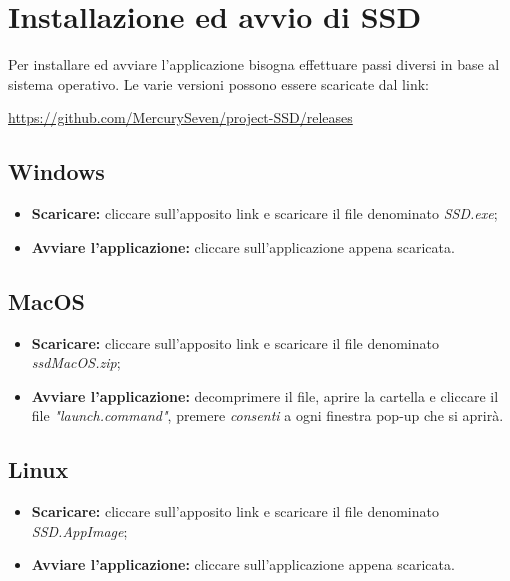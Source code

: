 \section{Installazione ed avvio di SSD}
Per installare ed avviare l'applicazione  bisogna effettuare passi diversi in base al sistema operativo. Le varie versioni possono essere scaricate dal link: \newline{}
\centerline{\url{https://github.com/MercurySeven/project-SSD/releases}}

\subsection{Windows}
\begin{itemize}
\item \textbf{Scaricare:} cliccare sull'apposito link e scaricare il file denominato \textit{SSD.exe};
\item \textbf{Avviare l'applicazione:} cliccare sull'applicazione appena scaricata.
\end{itemize}

\subsection{MacOS}
\begin{itemize}
\item \textbf{Scaricare:} cliccare sull'apposito link e scaricare il file denominato \textit{ssdMacOS.zip};
\item \textbf{Avviare l'applicazione:} decomprimere il file, aprire la cartella e cliccare il file \textit{"launch.command"}, premere \textit{consenti} a ogni finestra pop-up che si aprirà.
\end{itemize}

\subsection{Linux}
\begin{itemize}
\item \textbf{Scaricare:} cliccare sull'apposito link e scaricare il file denominato \textit{SSD.AppImage};
\item \textbf{Avviare l'applicazione:} cliccare sull'applicazione appena scaricata.
\end{itemize}

